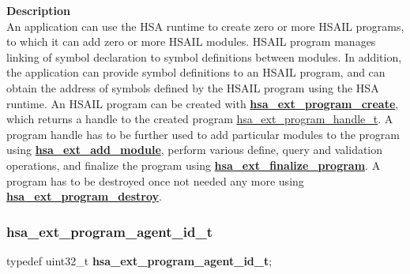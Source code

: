 \documentclass[final,oneside]{book}
\newcommand{\reffun}[1]{\textbf{#1}}
\newenvironment{mylongtable}{\rowcolors{0}{lightgray}{lightgray}\longtable} {
\endlongtable}
\begin{document}
\vspace{-4mm}\noindent\textbf{Description}\\[1mm]
An application can use the HSA runtime to create zero or more HSAIL programs, to which it can add zero or more HSAIL modules. HSAIL program manages linking of symbol declaration to symbol definitions between modules. In addition, the application can provide symbol definitions to an HSAIL program, and can obtain the address of symbols defined by the HSAIL program using the HSA runtime. An HSAIL program can be created with \hyperlink{group__ext-linker_1gad67b0ec80bc0e9a18336a68cf741b6e8}{\reffun{hsa_\-ext_\-program_\-create}}, which returns a handle to the created program \hyperlink{group__ext-linker_1gaea8d90863414407ddba7e318db7412f9}{hsa_\-ext_\-program_\-handle_\-t}. A program handle has to be further used to add particular modules to the program using \hyperlink{group__ext-linker_1gaf8d506d1fbdb2cde2392478ea344ca87}{\reffun{hsa_\-ext_\-add_\-module}}, perform various define, query and validation operations, and finalize the program using \hyperlink{group__ext-linker_1ga0c592594fa988c24b661146f79120399}{\reffun{hsa_\-ext_\-finalize_\-program}}. A program has to be destroyed once not needed any more using \hyperlink{group__ext-linker_1gad52eaf70ef7263cf188747e64553643f}{\reffun{hsa_\-ext_\-program_\-destroy}}. 


\subsubsection{hsa_\-ext_\-program_\-agent_\-id_\-t}
\vspace{-5.5mm}\begin{mylongtable}{@{}p{\textwidth}}
\rule{0pt}{3ex}\rule[-2.5ex]{0pt}{0pt}typedef uint32_\-t  \hypertarget{group__ext-linker_1gae5495f2eba536530c9dd422c93ae2028}{\textbf{hsa_\-ext_\-program_\-agent_\-id_\-t}};
\end{mylongtable}
\vspace{-5mm}
\end{document}
